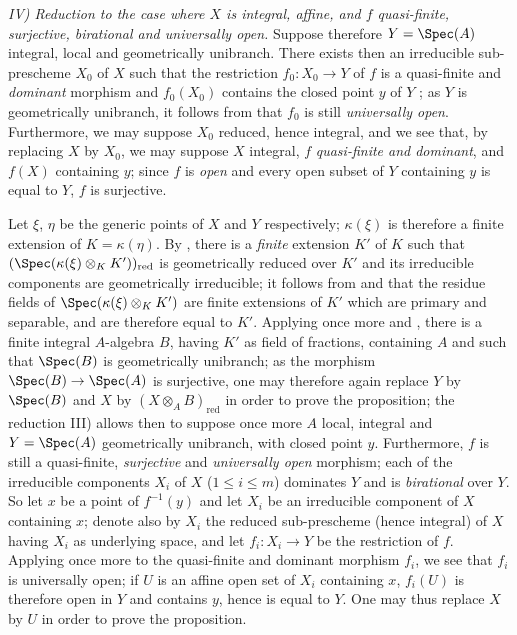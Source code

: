 \emph{IV) Reduction to the case where $X$ is integral, affine, and $f$ quasi-finite, surjective, birational and universally open.}
Suppose therefore $Y=\Spec(A)$ integral, local and geometrically unibranch.
There exists then an irreducible sub-prescheme $X_0$ of $X$ such that the restriction $f_0:X_0\to Y$ of $f$ is a quasi-finite and \emph{dominant} morphism and $f_0(X_0)$ contains the closed point $y$ of $Y$ ; as $Y$ is geometrically unibranch, it follows from  that $f_0$ is still \emph{universally open}.
Furthermore, we may suppose $X_0$ reduced, hence integral, and we see that, by replacing $X$ by $X_0$, we may suppose $X$ integral, $f$ \emph{quasi-finite and dominant}, and $f(X)$ containing $y$; since $f$ is \emph{open} and every open subset of $Y$ containing $y$ is equal to $Y$, $f$ is surjective.

Let $\xi$, $\eta$ be the generic points of $X$ and $Y$ respectively; $\kappa(\xi)$ is therefore a finite extension of $K=\kappa(\eta)$.
By , there is a \emph{finite} extension $K'$ of $K$ such that $(\Spec(\kappa(\xi)\otimes_K K'))_{\mathrm{red}}$ is geometrically reduced over $K'$ and its irreducible components are geometrically irreducible; it follows from  and  that the residue fields of $\Spec(\kappa(\xi)\otimes_K K')$ are finite extensions of $K'$ which are primary and separable, and are therefore equal to $K'$.
Applying once more  and , there is a finite integral $A$-algebra $B$, having $K'$ as field of fractions, containing $A$ and such that $\Spec(B)$ is geometrically unibranch; as the morphism $\Spec(B)\to\Spec(A)$ is surjective, one may therefore again replace $Y$ by $\Spec(B)$ and $X$ by $(X\otimes_A B)_{\mathrm{red}}$ in order to prove the proposition; the reduction III) allows then to suppose once more $A$ local, integral and $Y=\Spec(A)$ geometrically unibranch, with closed point $y$.
Furthermore, $f$ is still a quasi-finite, \emph{surjective} and \emph{universally open} morphism; each of the irreducible components $X_i$ of $X$ ($1\leq i\leq m$) dominates $Y$  and is \emph{birational} over $Y$.
So let $x$ be a point of $f^{-1}(y)$ and let $X_i$ be an irreducible component of $X$ containing $x$; denote also by $X_i$ the reduced sub-prescheme (hence integral) of $X$ having $X_i$ as underlying space, and let $f_i:X_i\to Y$ be the restriction of $f$.
Applying once more  to the quasi-finite and dominant morphism $f_i$, we see that $f_i$ is universally open; if $U$ is an affine open set of $X_i$ containing $x$, $f_i(U)$ is therefore
open in $Y$ and contains $y$, hence is equal to $Y$.
One may thus replace $X$ by $U$ in order to prove the proposition.

